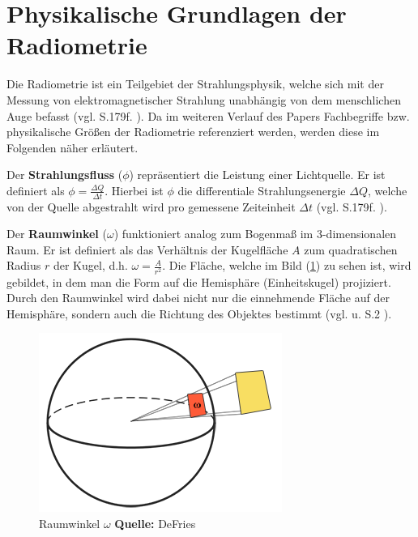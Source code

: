 \documentclass[
  11pt,
  a4paper,
  oneside
  ]{article}
\begin{document}
\section{Physikalische Grundlagen der Radiometrie}\label{sec:radiometrie}
Die Radiometrie ist ein Teilgebiet der Strahlungsphysik, welche sich mit der Messung von elektromagnetischer Strahlung unabhängig von dem menschlichen Auge befasst 
(vgl. S.179f. \cite{Beyerer2016}). Da im weiteren Verlauf des Papers Fachbegriffe bzw. physikalische Größen der Radiometrie referenziert werden, werden diese im Folgenden näher erläutert. 

Der \textbf{Strahlungsfluss} ($\phi$) repräsentiert die Leistung einer Lichtquelle. Er ist definiert als $\phi =\tfrac{\Delta Q}{\Delta t}$. Hierbei ist $\phi$ die differentiale Strahlungsenergie $\Delta Q$, welche von der Quelle abgestrahlt wird pro gemessene Zeiteinheit $\Delta t$ (vgl. S.179f. \cite{Beyerer2016}). 

Der \textbf{Raumwinkel} ($\omega$) funktioniert analog zum Bogenmaß im 3-dimensionalen Raum. Er ist definiert als das Verhältnis der Kugelfläche $A$ zum quadratischen Radius $r$ der Kugel, d.h. $\omega =\tfrac{A}{r^{2}}$. Die Fläche, welche im Bild
(\ref{fig:img6}) zu sehen ist, wird gebildet, in dem man die Form auf die Hemisphäre (Einheitskugel) projiziert. Durch den Raumwinkel wird dabei nicht nur die einnehmende Fläche auf der Hemisphäre, sondern auch die Richtung des Objektes bestimmt 
(vgl. \cite{learnOpenGL} u. S.2 \cite{irrlichtOrg}). 
\begin{figure}[H]
    \centering
    \includegraphics*[width=0.4\linewidth]{images/solid_angle.png}
    \caption{Raumwinkel $\omega$ \footnotesize\textbf{Quelle:} DeFries\cite{learnOpenGL}}
    \label{fig:img6}
\end{figure}
\end{document}
